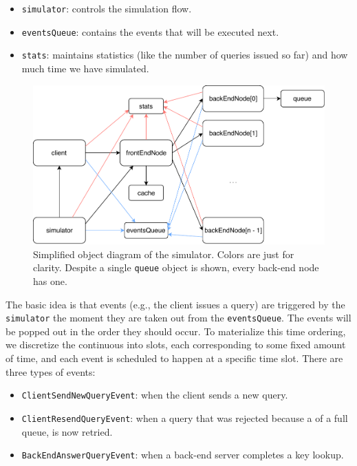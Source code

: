 \documentclass[10pt,letterpaper]{article}
\begin{document}
\begin{itemize}
	\item \texttt{simulator}: controls the simulation flow.
	\item \texttt{eventsQueue}: contains the events that will be executed next.
	\item \texttt{stats}: maintains statistics (like the number of queries issued so far) and how much time we have simulated.
\end{itemize}

\begin{figure}
	\centering
	\includegraphics[scale=0.75]{img/simulator.pdf}
	\caption{Simplified object diagram of the simulator. Colors are just for clarity. Despite a single \texttt{queue} object is shown, every back-end node has one.}
	\label{fig:simulator}
\end{figure}

The basic idea is that events (e.g., the client issues a query) are triggered by the \texttt{simulator} the moment they are taken out from the \texttt{eventsQueue}. The events will be popped out in the order they should occur. To materialize this time ordering, we discretize the continuous into slots, each corresponding to some fixed amount of time, and each event is scheduled to happen at a specific time slot. There are three types of events:

\begin{itemize}
	\item \texttt{ClientSendNewQueryEvent}: when the client sends a new query.
	\item \texttt{ClientResendQueryEvent}: when a query that was rejected because a of a full queue, is now retried.
	\item \texttt{BackEndAnswerQueryEvent}: when a back-end server completes a key lookup.
\end{itemize}
\end{document}
